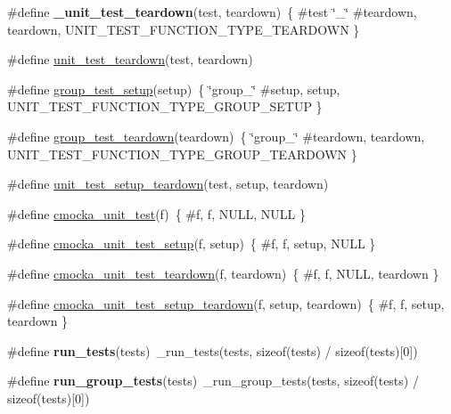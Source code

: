 \begin{DoxyCompactItemize}
\#define {\bfseries \+\_\+unit\+\_\+test\+\_\+teardown}(test,  teardown)~\{ \#test \char`\"{}\+\_\+\char`\"{} \#teardown, teardown, U\+N\+I\+T\+\_\+\+T\+E\+S\+T\+\_\+\+F\+U\+N\+C\+T\+I\+O\+N\+\_\+\+T\+Y\+P\+E\+\_\+\+T\+E\+A\+R\+D\+O\+WN \}
\item 
\#define \hyperlink{group__cmocka__exec_ga3fe0f3c69fb85843701876937b7217f4}{unit\+\_\+test\+\_\+teardown}(test,  teardown)
\item 
\#define \hyperlink{group__cmocka__exec_ga246dbcbb338e4becbfef009b2bb14b78}{group\+\_\+test\+\_\+setup}(setup)~\{ \char`\"{}group\+\_\+\char`\"{} \#setup, setup, U\+N\+I\+T\+\_\+\+T\+E\+S\+T\+\_\+\+F\+U\+N\+C\+T\+I\+O\+N\+\_\+\+T\+Y\+P\+E\+\_\+\+G\+R\+O\+U\+P\+\_\+\+S\+E\+T\+UP \}
\item 
\#define \hyperlink{group__cmocka__exec_ga03159d4169e85cb92bb0eba97cfcf18d}{group\+\_\+test\+\_\+teardown}(teardown)~\{ \char`\"{}group\+\_\+\char`\"{} \#teardown, teardown, U\+N\+I\+T\+\_\+\+T\+E\+S\+T\+\_\+\+F\+U\+N\+C\+T\+I\+O\+N\+\_\+\+T\+Y\+P\+E\+\_\+\+G\+R\+O\+U\+P\+\_\+\+T\+E\+A\+R\+D\+O\+WN \}
\item 
\#define \hyperlink{group__cmocka__exec_gaee80106db018434c00df4ba235415b26}{unit\+\_\+test\+\_\+setup\+\_\+teardown}(test,  setup,  teardown)
\item 
\#define \hyperlink{group__cmocka__exec_ga562719c550b5ce277aab6b0371f7f34f}{cmocka\+\_\+unit\+\_\+test}(f)~\{ \#f, f, N\+U\+LL, N\+U\+LL \}
\item 
\#define \hyperlink{group__cmocka__exec_gaaccacc105038e49462888a3ededa28c5}{cmocka\+\_\+unit\+\_\+test\+\_\+setup}(f,  setup)~\{ \#f, f, setup, N\+U\+LL \}
\item 
\#define \hyperlink{group__cmocka__exec_ga9b0d5ed78ddeba6d9aaa9a692cda426b}{cmocka\+\_\+unit\+\_\+test\+\_\+teardown}(f,  teardown)~\{ \#f, f, N\+U\+LL, teardown \}
\item 
\#define \hyperlink{group__cmocka__exec_gab9e5396c9a424ccbb5d30e6d421fd066}{cmocka\+\_\+unit\+\_\+test\+\_\+setup\+\_\+teardown}(f,  setup,  teardown)~\{ \#f, f, setup, teardown \}
\item 
\mbox{\label{group__cmocka__exec_ga2c863d3ecc2d4873b355af3cb7996939}} 
\#define {\bfseries run\+\_\+tests}(tests)~\+\_\+run\+\_\+tests(tests, sizeof(tests) / sizeof(tests)\mbox{[}0\mbox{]})
\item 
\mbox{\label{group__cmocka__exec_ga3459ccdfa6d086981173318ef8bca35d}} 
\#define {\bfseries run\+\_\+group\+\_\+tests}(tests)~\+\_\+run\+\_\+group\+\_\+tests(tests, sizeof(tests) / sizeof(tests)\mbox{[}0\mbox{]})

\end{DoxyCompactItemize}
